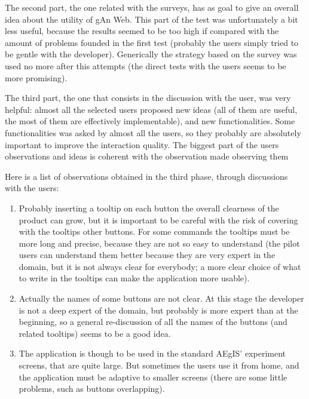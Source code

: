 The second part, the one related with the surveys, has as goal to give an overall idea about the utility of gAn Web. This part of the test was unfortunately a bit less useful, because the results seemed to be too high if compared with the amount of problems founded in the first test (probably the users simply tried to be gentle with the developer). Generically the strategy based on the survey was used no more after this attempts (the direct tests with the users seems to be more promising).

The third part, the one that consists in the discussion with the user, was very helpful: almost all the selected users proposed new ideas (all of them are useful, the most of them are effectively implementable), and new functionalities. Some functionalities was asked by almost all the users, so they probably are absolutely important to improve the interaction quality. 
The biggest part of the users observations and ideas is coherent with the observation made observing them 

Here is a list of observations obtained in the third phase, through discussions with the users:

\begin{enumerate}

\item 
Probably inserting a tooltip on each button the overall clearness of the product can grow, but it is important to be careful with the risk of covering with the tooltips other buttons. For some commands the tooltips must be more long and precise, because they are not so easy to understand (the pilot users can understand them better because they are very expert in the domain, but it is not always clear for everybody; a more clear choice of what to write in the tooltips can make the application more usable).  

\item
Actually the names of some buttons are not clear. At this stage the developer is not a deep expert of the domain, but probably is more expert than at the beginning, so a general re-discussion of all the names of the buttons (and related tooltips) seems to be a good idea.

\item 
The application is though to be used in the standard AEgIS' experiment screens, that are quite large. But sometimes the users use it from home, and the application must be adaptive to smaller screens (there are some little problems, such as buttons overlapping).

\end{enumerate}

